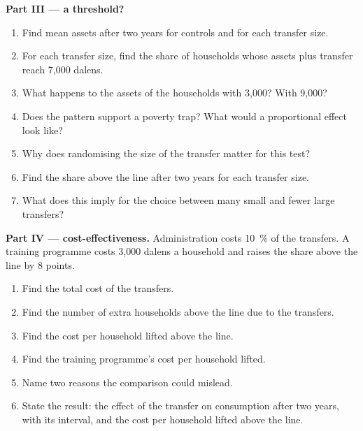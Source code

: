 \begin{problem}
\medskip\noindent\textbf{Part III --- a threshold?}
\begin{enumerate}[resume]
\item Find mean assets after two years for controls and for each transfer size.
\item For each transfer size, find the share of households whose assets plus transfer
reach 7{,}000 dalens.
\item What happens to the assets of the households with 3{,}000? With 9{,}000?
\item Does the pattern support a poverty trap? What would a proportional effect look
like?
\item Why does randomising the size of the transfer matter for this test?
\item Find the share above the line after two years for each transfer size.
\item What does this imply for the choice between many small and fewer large
transfers?
\end{enumerate}

\medskip\noindent\textbf{Part IV --- cost-effectiveness.} Administration costs 10~\% of the transfers.
A training programme costs 3{,}000 dalens a household and raises the share above the line by 8 points.
\begin{enumerate}[resume]
\item Find the total cost of the transfers.
\item Find the number of extra households above the line due to the transfers.
\item Find the cost per household lifted above the line.
\item Find the training programme's cost per household lifted.
\item Name two reasons the comparison could mislead.
\item State the result: the effect of the transfer on consumption after two years, with
its interval, and the cost per household lifted above the line.
\end{enumerate}
\end{problem}
